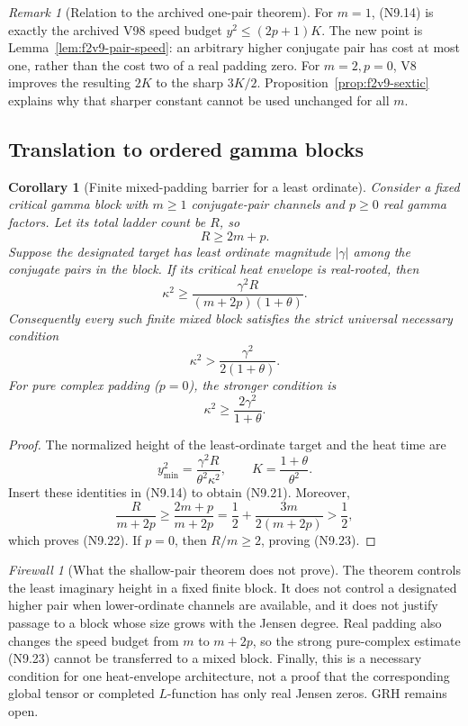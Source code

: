 \documentclass[11pt]{article}
\newtheorem{corollary}[theorem]{Corollary}
\theoremstyle{definition}
\theoremstyle{remark}
\newtheorem{remark}[theorem]{Remark}
\newtheorem{firewall}[theorem]{Firewall}
\newcommand{\abs}[1]{\left\lvert #1\right\rvert}
\begin{document}
\begin{remark}[Relation to the archived one-pair theorem]
For \(m=1\), \textup{(N9.14)} is exactly the archived V98 speed budget
\(y^2\le(2p+1)K\).  The new point is Lemma~\ref{lem:f2v9-pair-speed}:
an arbitrary higher conjugate pair has cost at most one, rather than the
cost two of a real padding zero.  For \(m=2,p=0\), V8 improves the resulting
\(2K\) to the sharp \(3K/2\).  Proposition~\ref{prop:f2v9-sextic} explains
why that sharper constant cannot be used unchanged for all \(m\).
\end{remark}

\subsection{Translation to ordered gamma blocks}

\begin{corollary}[Finite mixed-padding barrier for a least ordinate]
\label{cor:f2v9-gamma}
Consider a fixed critical gamma block with \(m\ge1\) conjugate-pair channels
and \(p\ge0\) real gamma factors.  Let its total ladder count be \(R\), so
\[
 R\ge2m+p.
 \tag{N9.20}
\]
Suppose the designated target has least ordinate magnitude \(\abs{\gamma}\)
among the conjugate pairs in the block.  If its critical heat envelope is
real-rooted, then
\[
 \boxed{
 \kappa^2\ge
 \frac{\gamma^2R}{(m+2p)(1+\theta)}.}
 \tag{N9.21}
\]
Consequently every such finite mixed block satisfies the strict universal
necessary condition
\[
 \boxed{
 \kappa^2>\frac{\gamma^2}{2(1+\theta)}.}
 \tag{N9.22}
\]
For pure complex padding (\(p=0\)), the stronger condition is
\[
 \boxed{
 \kappa^2\ge\frac{2\gamma^2}{1+\theta}.}
 \tag{N9.23}
\]
\end{corollary}

\begin{proof}
The normalized height of the least-ordinate target and the heat time are
\[
 y_{\min}^2=\frac{\gamma^2R}{\theta^2\kappa^2},
 \qquad
 K=\frac{1+\theta}{\theta^2}.
 \tag{N9.24}
\]
Insert these identities in \textup{(N9.14)} to obtain
\textup{(N9.21)}.  Moreover,
\[
 \frac{R}{m+2p}
 \ge\frac{2m+p}{m+2p}
 =\frac12+\frac{3m}{2(m+2p)}
 >\frac12,
 \tag{N9.25}
\]
which proves \textup{(N9.22)}.  If \(p=0\), then \(R/m\ge2\), proving
\textup{(N9.23)}.
\end{proof}

\begin{firewall}[What the shallow-pair theorem does not prove]
The theorem controls the least imaginary height in a fixed finite block.
It does not control a designated higher pair when lower-ordinate channels
are available, and it does not justify passage to a block whose size grows
with the Jensen degree.  Real padding also changes the speed budget from
\(m\) to \(m+2p\), so the strong pure-complex estimate
\textup{(N9.23)} cannot be transferred to a mixed block.  Finally, this is
a necessary condition for one heat-envelope architecture, not a proof that
the corresponding global tensor or completed \(L\)-function has only real
Jensen zeros.  GRH remains open.
\end{firewall}
\end{document}

